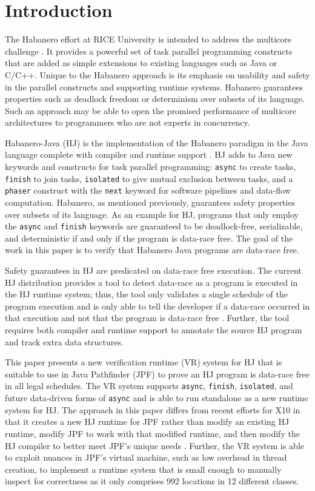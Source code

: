 \section{Introduction}
The Habanero effort at RICE University is intended to address the
multicore challenge \cite{habanero}.
%
It provides a powerful set of task parallel programming constructs that are added as
simple extensions to existing languages such as Java or C/C++.
%
Unique to the Habanero approach is its emphasis on usability and safety
in the parallel constructs and supporting runtime systems.
%
Habanero guarantees properties such as deadlock freedom or determinism over subsets of its language.
%
Such an approach may be able to open the promised performance of
multicore architectures to programmers who are not experts in
concurrency.

%
Habanero-Java (HJ) is the implementation of the Habanero paradigm in
the Java language complete with compiler and runtime support \cite{Cave:2011:HNA:2093157.2093165}. 
%
HJ adds to Java new keywords and constructs for task parallel
programming: \texttt{async} to create tasks, \texttt{finish} to join
tasks, \texttt{isolated} to give mutual exclusion between tasks, and a
\texttt{phaser} construct with the \texttt{next} keyword for software
pipelines and data-flow computation. 
%
Habanero, as mentioned previously, guarantees safety properties over subsets of its language. 
%
As an example for HJ, programs that only employ the \texttt{async} and
\texttt{finish} keywords are guaranteed to be deadlock-free,
serializable, and deterministic if and only if the program is
data-race free.
%
The goal of the work in this paper is to verify that Habanero Java programs are data-race free. 

Safety guarantees in HJ are predicated on data-race free execution. 
%
The current HJ distribution provides a tool to detect data-race as a
program is executed in the HJ runtime system;
%
thus, the tool only
validates a single schedule of the program execution and is only able to
tell the developer if a data-race occurred in that execution and not that the program is
data-race free \cite{Westbrook:2012:PPR:2367163.2367201,Westbrook:2011:PRR:2341616.2341627}. 
%
Further, the tool requires both compiler and runtime
support to annotate the source HJ program and track extra data
structures.

This paper presents a new verification runtime (VR) system for HJ that
is suitable to use in Java Pathfinder (JPF) to prove an HJ program is
data-race free in all legal schedules.
%
The VR system supports \texttt{async}, \texttt{finish},
\texttt{isolated}, and future data-driven forms of \texttt{async} and
is able to run standalone as a new runtime system for HJ.
%
The approach in this paper differs from recent efforts for X10 in
that it creates a new HJ runtime for JPF rather than modify an
existing HJ runtime, modify JPF to work with that modified runtime, and then
modify the HJ compiler to better meet JPF's unique needs \cite{conf:icst:GligoricMM12}.
% 
Further, the VR system is able to exploit
nuances in JPF's virtual machine, such as low overhead in thread
creation, to implement a runtime system that is small enough to manually
inspect for correctness as it only comprises 992 locations in 12 different classes. 


